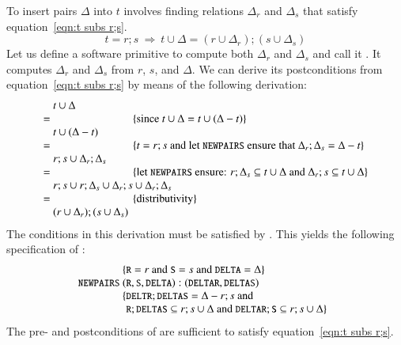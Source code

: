 \documentclass{elsarticle}
\begin{document}
	To insert pairs $\Delta$ into $t$ involves finding relations $\Delta_r$ and $\Delta_s$
	that satisfy equation~\ref{eqn:t subs r;s}.
\begin{equation}
t=r;s\ \Rightarrow\ t\cup\Delta=(r\cup \Delta_r);(s\cup \Delta_s)\label{eqn:t subs r;s}
\end{equation}
	Let us define a software primitive to compute both $\Delta_r$ and $\Delta_s$ and call it .
	It computes $\Delta_r$ and $\Delta_s$ from $r$, $s$, and $\Delta$.
	We can derive its postconditions from equation~\ref{eqn:t subs r;s} by means of the following derivation:
\[\begin{array}{r@{~}l}
&t\cup\Delta\\
=&\hspace{1in}\{\text{since }t\cup\Delta=t\cup(\Delta-t)\}\\
&t\cup(\Delta-t)\\
=&\hspace{1in}\{t=r;s\text{ and let \code{NEWPAIRS} ensure that }\Delta_r;\Delta_s=\Delta-t\}\\
&r;s\cup\Delta_r;\Delta_s\\
=&\hspace{1in}\{\text{let \code{NEWPAIRS} ensure: }r;\Delta_s\subs t\cup\Delta\text{ and }\Delta_r;s\subs t\cup\Delta\}\\
&r;s\cup r;\Delta_s\cup \Delta_r;s\cup \Delta_r;\Delta_s\\
=&\hspace{1in}\{\text{distributivity}\}\\
&(r\cup \Delta_r);(s\cup \Delta_s)
\end{array}\]
	The conditions in this derivation must be satisfied by . 
	This yields the following specification of :
\[\begin{array}{r@{~}l}
&\{\code{R}=r\text{ and }\code{S}=s\text{ and }\code{DELTA}=\Delta\}\\
\code{NEWPAIRS}&(\code{R}, \code{S}, \code{DELTA}): (\code{DELTAR}, \code{DELTAS})\\
&\begin{array}[t]{@{}l@{}l}
        \{&\code{DELTR};\code{DELTAS}=\Delta - r;s\text{ and }\\
          &\code{R};\code{DELTAS}\subs r;s\cup\Delta\text{ and }\code{DELTAR};\code{S}\subs r;s\cup\Delta\}
\end{array}
\end{array}\]
	The pre- and postconditions of  are sufficient to satisfy equation~\ref{eqn:t subs r;s}.
\end{document}
